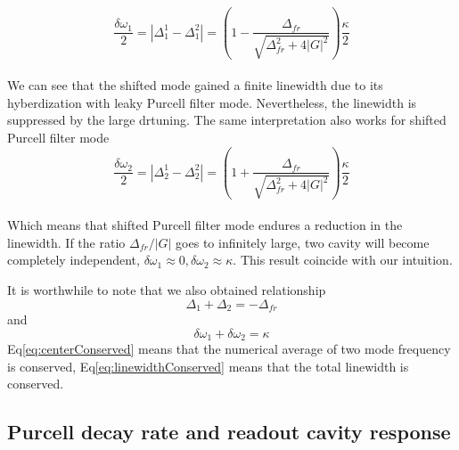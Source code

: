 \\
\begin{equation}
	\frac{\delta \omega_1}{2} = |\Delta_1^1 - \Delta_1^2| = \left (1 - \frac{\Delta_{fr}}{\sqrt{ \Delta_{fr}^2 + 4 |G| ^ 2}} \right) \frac{\kappa}{2}
\end{equation}
\\
We can see that the shifted mode gained a finite linewidth due to its hyberdization with leaky Purcell filter mode. Nevertheless, the linewidth is suppressed by the large drtuning. The same interpretation also works for shifted Purcell filter mode
\\
\begin{equation}
	\frac{\delta \omega_2}{2} = |\Delta_2^1 - \Delta_2^2| = \left (1 + \frac{\Delta_{fr}}{\sqrt{ \Delta_{fr}^2 + 4 |G| ^ 2}} \right) \frac{\kappa}{2}
\end{equation}
\\
Which means that shifted Purcell filter mode endures a reduction in the linewidth. If the ratio $\Delta_{fr}/|G|$ goes to infinitely large, two cavity will become completely independent, $\delta \omega_1 \approx 0, \delta \omega_2 \approx \kappa$. This result coincide with our intuition.

It is worthwhile to note that we also obtained relationship
\begin{equation}
	\Delta_1 + \Delta_2 = - \Delta_{fr}
	\label{eq:centerConserved}
\end{equation}
and
\begin{equation}
	\delta \omega_1 + \delta \omega_2 = \kappa
	\label{eq:linewidthConserved}
\end{equation}
Eq\ref{eq:centerConserved} means that the numerical average of two mode frequency is conserved, Eq\ref{eq:linewidthConserved} means that the total linewidth is conserved.

\subsection{Purcell decay rate and readout cavity response}